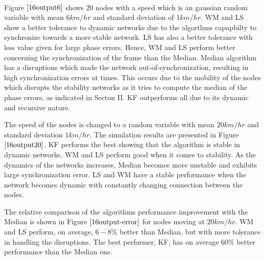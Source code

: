 \documentclass[journal]{IEEEtran}
\begin{document}
\paragraph*{}
Figure $\ref{16output6}$ shows 20 nodes with a speed which is an
gaussian random variable with mean $6km/hr$ and standard deviation
of 1$km/hr$. WM and LS show a better tolerance to dynamic networks
due to the algorthms capapbilty to synchronize towards a more stable
network. LS has also a better tolerance with less value given for
large phase errors. Hence, WM and LS perform better concerning the
synchronization of the frame than the Median.  Median algorithm has
a disruptions which made the network out-of-synchronization,
resulting in high synchronization errors at times. This occurs due
to the mobility of the nodes which disrupts the stability networks
as it tries to compute the median of the phase errors, as indicated
in Secton II. KF outperforms all due to its dynamic and recursive nature.
\par
The speed of the nodes is changed to a random variable with mean
$20km/hr$ and standard deviation $1km/hr$. The simulation results
are presented in Figure $\ref{16output20}$. KF performs the best
showing that the algorithm is stable in dynamic networks. WM and LS
perform good when it comes to stability. As the dynamics of the
networks increases, Median becomes more unstable and exhibits large
synchronization error. LS and WM have a stable performance when the
network becomes dynamic with constantly changing connection between
the nodes.
\par
The relative comparison of the algorithms performance improvement
with the Median is shown in Figure $\ref{16output-error}$ for nodes
moving at $20km/hr$. WM and LS perform, on average, $6-8\%$ better
than Median, but with more tolerance in handling the disruptions.
The best performer, KF, has on average $60\%$ better performance
than the Median one.
\end{document}
